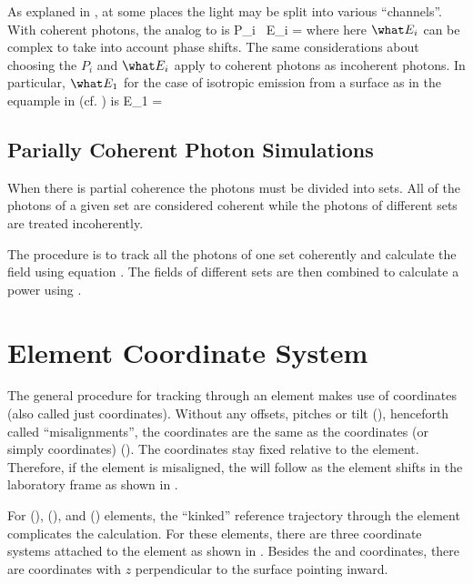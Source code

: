 As explaned in , at some places the light may be split
into various ``channels''. With coherent photons, the analog to  is
\Begineq
  P_i \, \what E_i = 
  \label{rpss2}
\Endeq
where here $\what E_i$ can be complex to take into account phase shifts.
The same considerations about choosing the $P_i$ and $\what E_i$ apply to
coherent photons as incoherent photons. In particular, $\what E_1$ for the
case of isotropic emission from a surface as in the equample in
 (cf. ) is
\Begineq
  \what E_1 = 
\Endeq

\subsection{Parially Coherent Photon Simulations}

When there is partial coherence the photons must be divided into
sets. All of the photons of a given set are considered coherent while
the photons of different sets are treated incoherently.

The procedure is to track all the photons of one set coherently and
calculate the field using equation . The fields of
different sets are then combined to calculate a power using
.

\section{Element Coordinate System}
\label{s:photon.ele.coords}

The general procedure for tracking through an element makes use of
 coordinates (also called just 
coordinates). Without any offsets, pitches or tilt (), henceforth
called ``misalignments'', the  coordinates are the same
as the  coordinates (or simply 
coordinates) (). The  coordinates stay fixed
relative to the element. Therefore, if the element is misaligned, the
 will follow as the element shifts in the
laboratory frame as shown in .

For  (),  (), and 
() elements, the ``kinked'' reference trajectory through the element complicates
the calculation. For these elements, there are three coordinate systems attached to the element as
shown in . Besides the  and 
coordinates, there are  coordinates with $z$ perpendicular to the surface
pointing inward.

